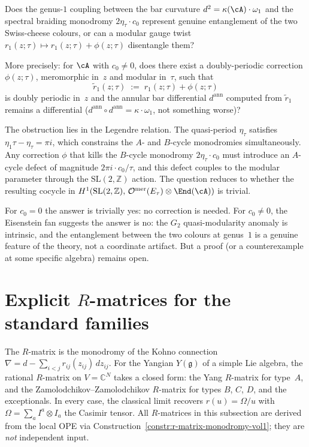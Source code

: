 \begin{question}
\label{q:genus1-entanglement}
\ClaimStatusOpen
Does the genus-$1$ coupling between the bar curvature
$d^2=\kappa(\cA)\cdot\omega_1$ and the spectral braiding
monodromy $2\eta_\tau\cdot c_0$ represent genuine entanglement
of the two Swiss-cheese colours, or can a modular gauge twist
$r_1(z;\tau)\mapsto r_1(z;\tau)+\phi(z;\tau)$ disentangle them?

More precisely: for $\cA$ with $c_0\ne 0$, does there exist
a doubly-periodic correction $\phi(z;\tau)$, meromorphic in~$z$
and modular in~$\tau$, such that
\[
\widetilde{r}_1(z;\tau)
\;:=\;
r_1(z;\tau)+\phi(z;\tau)
\]
is doubly periodic in~$z$ and the annular bar differential
$d^{\mathrm{ann}}$ computed from $\widetilde{r}_1$ remains
a differential \textup{(}$d^{\mathrm{ann}}\circ d^{\mathrm{ann}}
=\kappa\cdot\omega_1$, not something worse\textup{)}?

The obstruction lies in the Legendre relation. The
quasi-period $\eta_\tau$ satisfies
$\eta_1\tau-\eta_\tau=\pi i$, which constrains the
$A$- and $B$-cycle monodromies simultaneously. Any
correction $\phi$ that kills the $B$-cycle monodromy
$2\eta_\tau\cdot c_0$ must introduce an $A$-cycle defect of
magnitude $2\pi i\cdot c_0/\tau$, and this defect couples
to the modular parameter through the $\mathrm{SL}(2,\mathbb{Z})$
action. The question reduces to whether the resulting
cocycle in
$H^1(\mathrm{SL}(2,\mathbb{Z}),\,
\mathcal{O}^{\mathrm{mer}}(E_\tau)\otimes\End(\cA))$
is trivial.

For $c_0=0$ the answer is trivially yes: no correction
is needed. For $c_0\ne 0$, the Eisenstein fan suggests
the answer is no: the $G_2$ quasi-modularity anomaly
is intrinsic, and the entanglement between the two colours
at genus~$1$ is a genuine feature of the theory, not a
coordinate artifact. But a proof (or a counterexample
at some specific algebra) remains open.
\end{question}


\section{Explicit $R$-matrices for the standard families}
\label{sec:explicit-r-matrices}

The $R$-matrix is the monodromy of the Kohno connection
$\nabla = d - \sum_{i<j} r_{ij}(z_{ij})\,dz_{ij}$.
For the Yangian $Y(\mathfrak{g})$ of a simple Lie algebra,
the rational $R$-matrix on $V = \mathbb{C}^N$ takes a closed form:
the Yang $R$-matrix for type~$A$, and the
Zamolodchikov--Zamolodchikov $R$-matrix for types $B$, $C$, $D$,
and the exceptionals. In every case, the classical limit
recovers $r(u) = \Omega/u$ with $\Omega = \sum_a I^a \otimes I_a$
the Casimir tensor. All $R$-matrices in this subsection are derived from the
local OPE via Construction~\ref{constr:r-matrix-monodromy-vol1};
they are \emph{not} independent input.

